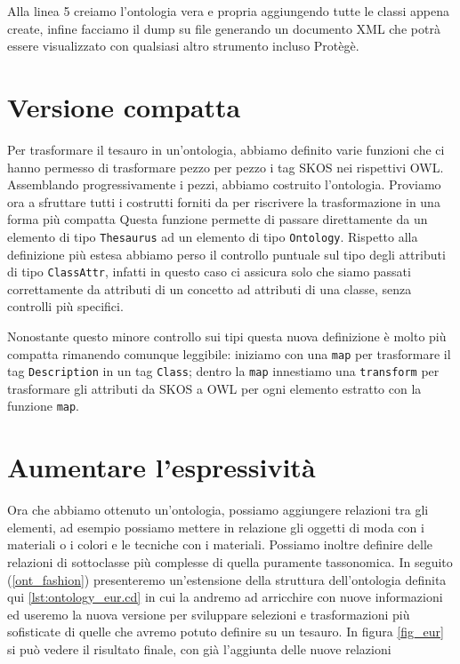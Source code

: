 Alla linea 5 creiamo l'ontologia vera e propria aggiungendo tutte le classi appena create, infine facciamo il dump su file generando un documento XML che potrà essere visualizzato con qualsiasi altro strumento incluso Protègè.
\section{Versione compatta}
Per trasformare il tesauro in un'ontologia, abbiamo definito varie funzioni che ci hanno permesso di trasformare pezzo per pezzo i tag SKOS nei rispettivi OWL. Assemblando progressivamente i pezzi, abbiamo costruito l'ontologia. Proviamo ora a sfruttare tutti i costrutti forniti da \cduce per riscrivere la trasformazione in una forma più compatta
Questa funzione permette di passare direttamente da un elemento di tipo \verb|Thesaurus| ad un elemento di tipo \verb|Ontology|. Rispetto alla definizione più estesa abbiamo perso il controllo puntuale sul tipo degli attributi di tipo \verb|ClassAttr|, infatti in questo caso \cduce ci assicura solo che siamo passati correttamente da attributi di un concetto ad attributi di una classe, senza controlli più specifici.

Nonostante questo minore controllo sui tipi questa nuova definizione è molto più compatta rimanendo comunque leggibile: iniziamo con una \verb|map| per trasformare il tag \verb|Description| in un tag \verb|Class|; dentro la \verb|map| innestiamo una \verb|transform| per trasformare gli attributi da SKOS a OWL per ogni elemento estratto con la funzione \verb|map|.

\section{Aumentare l'espressività}\label{expr}
Ora che abbiamo ottenuto un'ontologia, possiamo aggiungere relazioni tra gli elementi, ad esempio possiamo mettere in relazione gli oggetti di moda con i materiali o i colori e le tecniche con i materiali. Possiamo inoltre definire delle relazioni di sottoclasse più complesse di quella puramente tassonomica.  In seguito (\ref{ont_fashion}) presenteremo un'estensione della struttura dell'ontologia definita qui \ref{lst:ontology_eur.cd} in cui la andremo ad arricchire con nuove informazioni ed useremo la nuova versione per sviluppare selezioni e trasformazioni più sofisticate di quelle che avremo potuto definire su un tesauro. In figura \ref{fig_eur} si può vedere il risultato finale, con già l'aggiunta delle nuove relazioni

